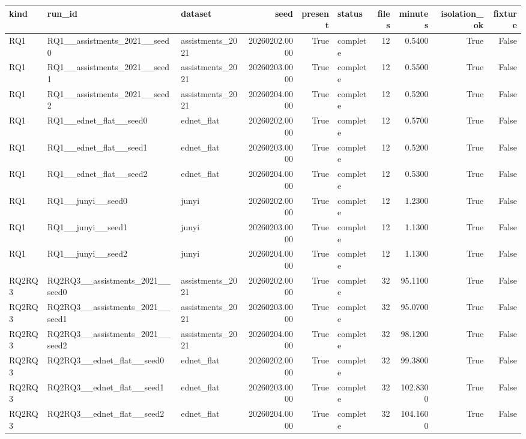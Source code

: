 \begin{tabular}{lllrrlrrrr}
\toprule
kind & run\_id & dataset & seed & present & status & files & minutes & isolation\_ok & fixture \\
\midrule
RQ1 & RQ1\_\_assistments\_2021\_\_seed0 & assistments\_2021 & 20260202.0000 & True & complete & 12 & 0.5400 & True & False \\
RQ1 & RQ1\_\_assistments\_2021\_\_seed1 & assistments\_2021 & 20260203.0000 & True & complete & 12 & 0.5500 & True & False \\
RQ1 & RQ1\_\_assistments\_2021\_\_seed2 & assistments\_2021 & 20260204.0000 & True & complete & 12 & 0.5200 & True & False \\
RQ1 & RQ1\_\_ednet\_flat\_\_seed0 & ednet\_flat & 20260202.0000 & True & complete & 12 & 0.5700 & True & False \\
RQ1 & RQ1\_\_ednet\_flat\_\_seed1 & ednet\_flat & 20260203.0000 & True & complete & 12 & 0.5200 & True & False \\
RQ1 & RQ1\_\_ednet\_flat\_\_seed2 & ednet\_flat & 20260204.0000 & True & complete & 12 & 0.5300 & True & False \\
RQ1 & RQ1\_\_junyi\_\_seed0 & junyi & 20260202.0000 & True & complete & 12 & 1.2300 & True & False \\
RQ1 & RQ1\_\_junyi\_\_seed1 & junyi & 20260203.0000 & True & complete & 12 & 1.1300 & True & False \\
RQ1 & RQ1\_\_junyi\_\_seed2 & junyi & 20260204.0000 & True & complete & 12 & 1.1300 & True & False \\
RQ2RQ3 & RQ2RQ3\_\_assistments\_2021\_\_seed0 & assistments\_2021 & 20260202.0000 & True & complete & 32 & 95.1100 & True & False \\
RQ2RQ3 & RQ2RQ3\_\_assistments\_2021\_\_seed1 & assistments\_2021 & 20260203.0000 & True & complete & 32 & 95.0700 & True & False \\
RQ2RQ3 & RQ2RQ3\_\_assistments\_2021\_\_seed2 & assistments\_2021 & 20260204.0000 & True & complete & 32 & 98.1200 & True & False \\
RQ2RQ3 & RQ2RQ3\_\_ednet\_flat\_\_seed0 & ednet\_flat & 20260202.0000 & True & complete & 32 & 99.3800 & True & False \\
RQ2RQ3 & RQ2RQ3\_\_ednet\_flat\_\_seed1 & ednet\_flat & 20260203.0000 & True & complete & 32 & 102.8300 & True & False \\
RQ2RQ3 & RQ2RQ3\_\_ednet\_flat\_\_seed2 & ednet\_flat & 20260204.0000 & True & complete & 32 & 104.1600 & True & False \\

\end{tabular}
